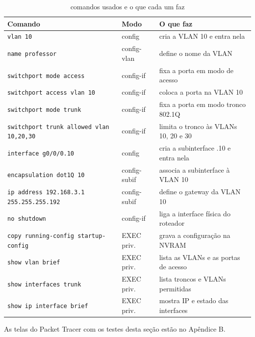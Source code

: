 \begin{table}[H]
\caption{comandos usados e o que cada um faz}\label{tab:comandos}
\footnotesize\renewcommand{\arraystretch}{1.18}
\begin{tabularx}{\textwidth}{@{}>{\raggedright\arraybackslash}p{7.3cm}l>{\raggedright\arraybackslash}X@{}}
\toprule
\textbf{Comando} & \textbf{Modo} & \textbf{O que faz}\\
\midrule
\texttt{vlan 10} & config & cria a VLAN 10 e entra nela\\
\texttt{name professor} & config-vlan & define o nome da VLAN\\
\texttt{switchport mode access} & config-if & fixa a porta em modo de acesso\\
\texttt{switchport access vlan 10} & config-if & coloca a porta na VLAN 10\\
\texttt{switchport mode trunk} & config-if & fixa a porta em modo tronco 802.1Q\\
\texttt{switchport trunk allowed vlan 10,20,30} & config-if & limita o tronco às VLANs 10, 20 e 30\\
\texttt{interface g0/0/0.10} & config & cria a subinterface .10 e entra nela\\
\texttt{encapsulation dot1Q 10} & config-subif & associa a subinterface à VLAN 10\\
\texttt{ip address 192.168.3.1 255.255.255.192} & config-subif & define o gateway da VLAN 10\\
\texttt{no shutdown} & config-if & liga a interface física do roteador\\
\texttt{copy running-config startup-config} & EXEC priv. & grava a configuração na NVRAM\\
\texttt{show vlan brief} & EXEC priv. & lista as VLANs e as portas de acesso\\
\texttt{show interfaces trunk} & EXEC priv. & lista troncos e VLANs permitidas\\
\texttt{show ip interface brief} & EXEC priv. & mostra IP e estado das interfaces\\
\bottomrule
\end{tabularx}
\end{table}


As telas do Packet Tracer com os testes desta seção estão no Apêndice B.


